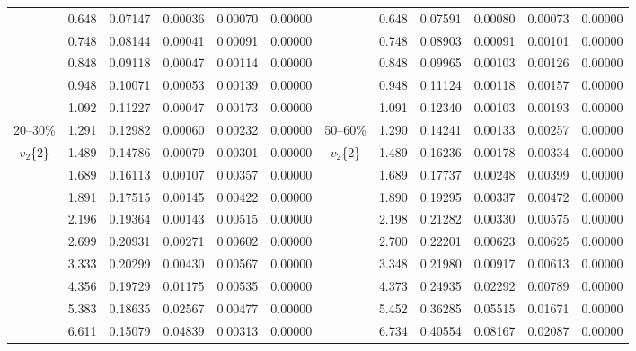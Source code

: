 \documentclass[aps,prc,superscriptaddress,showpacs,floatfix,twocolumn]{revtex4}
\begin{document}
\begin{table}[htbp]
\begin{ruledtabular}
\begin{tabular}{c|ccccc||c|ccccc}
 & 0.648 & 0.07147   &  0.00036  &  0.00070 & 0.00000 &  & 0.648 & 0.07591   & 0.00080 & 0.00073  & 0.00000 \\
 & 0.748 & 0.08144   &  0.00041  &  0.00091 & 0.00000 &  & 0.748 & 0.08903   & 0.00091 & 0.00101  & 0.00000 \\
 & 0.848 & 0.09118   &  0.00047  &  0.00114 & 0.00000 &  & 0.848 & 0.09965   & 0.00103 & 0.00126  & 0.00000 \\
 & 0.948 & 0.10071   &  0.00053  &  0.00139 & 0.00000 &  & 0.948 & 0.11124   & 0.00118 & 0.00157  & 0.00000 \\
 & 1.092 & 0.11227   &  0.00047  &  0.00173 & 0.00000 &  & 1.091 & 0.12340   & 0.00103 & 0.00193  & 0.00000 \\
20--30\% 
 & 1.291 & 0.12982   &  0.00060  &  0.00232   & 0.00000 &  50--60\% & 1.290 & 0.14241   & 0.00133 & 0.00257  & 0.00000 \\
$v_2$\{2\} 
 & 1.489 & 0.14786   &  0.00079  &  0.00301  & 0.00000 &  $v_2$\{2\} & 1.489 & 0.16236   & 0.00178 & 0.00334  & 0.00000 \\
 & 1.689 & 0.16113   &  0.00107  &  0.00357  & 0.00000 &             & 1.689 & 0.17737   & 0.00248 & 0.00399  & 0.00000 \\
 & 1.891 & 0.17515   &  0.00145  &  0.00422  & 0.00000 &             & 1.890 & 0.19295   & 0.00337 & 0.00472  & 0.00000 \\
 & 2.196 & 0.19364   &  0.00143  &  0.00515  & 0.00000 &             & 2.198 & 0.21282   & 0.00330 & 0.00575  & 0.00000 \\
 & 2.699 & 0.20931   &  0.00271  &  0.00602  & 0.00000 &             & 2.700 & 0.22201   & 0.00623 & 0.00625  & 0.00000 \\
 & 3.333 & 0.20299   &  0.00430  &  0.00567  & 0.00000 &             & 3.348 & 0.21980   & 0.00917 & 0.00613  & 0.00000 \\
 & 4.356 & 0.19729   &  0.01175  &  0.00535  & 0.00000 &             & 4.373 & 0.24935   & 0.02292 & 0.00789  & 0.00000 \\
 & 5.383 & 0.18635   &  0.02567  &  0.00477  & 0.00000 &             & 5.452 & 0.36285   & 0.05515 & 0.01671  & 0.00000 \\
 & 6.611 & 0.15079   &  0.04839  &  0.00313  & 0.00000 &             & 6.734 & 0.40554   & 0.08167 & 0.02087  & 0.00000 \\
\end{tabular} \end{ruledtabular} \endgroup
\end{table}
\end{document}
